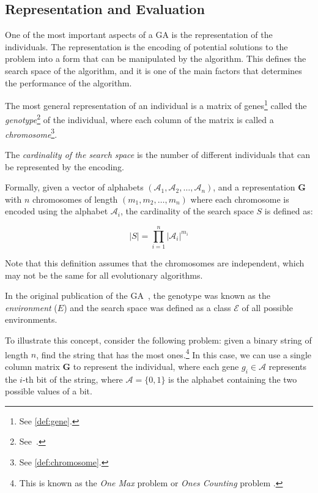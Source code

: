 \subsection{Representation and Evaluation}
\label{sec:bg:ga:repr}
  One of the most important aspects of a GA is the representation of the individuals.
  The representation is the encoding of potential solutions to the problem into a form that can be
  manipulated by the algorithm.
  This defines the search space of the algorithm, and it is one of the main factors that
  determines the performance of the algorithm.

  The most general representation of an individual is a matrix of genes\footnote{
    See \vref{def:gene}.
  } called the \emph{genotype}\footnote{
    See~\autocite{wilhelmstotterJeneticsJavaGenetica}.
  } of the individual, where each column of the matrix is called a
  \emph{chromosome}\footnote{
    See \vref{def:chromosome}.
  }.
  
  \begin{definition}
  \label{def:cardinality_of_the_search_space}
    The \emph{cardinality of the search space} is the number of different individuals that 
    can be represented by the encoding.

    Formally, given a vector of alphabets \((\mathcal{A}_1, \mathcal{A}_2, \dots, \mathcal{A}_n)\), 
    and a representation \(\mathbf{G}\) with \(n\) chromosomes of length \((m_1, m_2, \dots, 
    m_n)\) where each chromosome is encoded using the alphabet \(\mathcal{A}_i\), the cardinality 
    of the search space \(S\) is defined as:
    
    \begin{equation}
      \label{eq:cardinality_of_the_search_space}
      |S| = \prod_{i=1}^n |\mathcal{A}_i|^{m_i}
    \end{equation}

    Note that this definition assumes that the chromosomes are independent, which may not be the 
    same for all evolutionary algorithms.
  \end{definition}

  \begin{remark}
    In the original publication of the GA~\autocite{hollandAdaptationNaturalArtificial1992a}, the
    genotype was known as the \emph{environment} (\(E\)) and the search space was defined as a class
    \(\mathcal{E}\) of all possible environments.
  \end{remark}

  To illustrate this concept, consider the following problem: given a binary string of length
  \(n\), find the string that has the most ones.\footnote{
    This is known as the \emph{One Max} problem \autocite{OneMaxProblema} or \emph{Ones Counting}
    problem \autocite{wilhelmstotterJeneticsJavaGenetica}.
  }
  In this case, we can use a single column matrix \(\mathbf{G}\) to represent the individual, 
  where each gene \(g_i \in \mathcal{A}\) represents the \(i\)-th bit of the string, where 
  \(\mathcal{A} = \{0, 1\}\) is the alphabet containing the two possible values of a bit.
  
